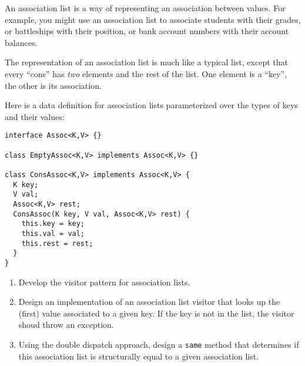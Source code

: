 \documentclass[11pt]{article}
\def\pts#1{\marginpar{\footnotesize \raggedright  \fbox{#1 {\sc Points}}}}
\newcounter{Pctr}
\newenvironment{problem}{\stepcounter{Pctr}%
\begin{description}
\item[\noindent{\bf Problem} \arabic{Pctr}] 
\end{description}}{\relax}
\begin{document}
\pts{45}
\begin{problem}
An association list is a way of representing an association between
values.  For example, you might use an association list to
associate students with their grades, or battleships with their
position, or bank account numbers with their account balances.

The representation of an association list is much like a typical list,
except that every ``cons'' has \emph{two} elements and the rest of the
list.  One element is a ``key'', the other is its association.

Here is a data definition for association lists parameterized over the
types of keys and their values:

\begin{verbatim}
interface Assoc<K,V> {}

class EmptyAssoc<K,V> implements Assoc<K,V> {}

class ConsAssoc<K,V> implements Assoc<K,V> {
  K key;
  V val;
  Assoc<K,V> rest;
  ConsAssoc(K key, V val, Assoc<K,V> rest) {
    this.key = key;
    this.val = val;
    this.rest = rest;
  }
}
\end{verbatim}

\begin{enumerate}
\item Develop the visitor pattern for association lists.
\item Design an implementation of an association list visitor that
  looks up the (first) value associated to a given key.  If the key is
  not in the list, the visitor shoud throw an exception.
\item Using the double dispatch approach, design a {\tt same} method
  that determines if this association list is structurally equal to a
  given association list.
\end{enumerate}
\end{problem}
\newpage
\ 
\newpage
\ 
\end{document}
